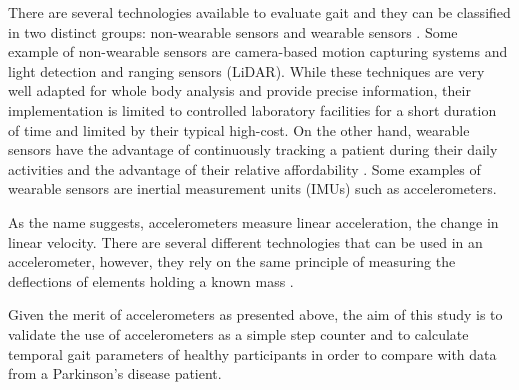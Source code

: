 There are several technologies available to evaluate gait and they can be classified in two distinct groups: non-wearable sensors and wearable sensors   \cite{muro-de-la-herran_gait_2014}. Some example of non-wearable sensors are camera-based motion capturing systems and light detection and ranging sensors (LiDAR). While these techniques are very well adapted for whole body analysis and provide precise information, their implementation is limited to controlled laboratory facilities for a short duration of time and limited by their typical high-cost. On the other hand, wearable sensors have the advantage of continuously tracking a patient during their daily activities and the advantage of their relative affordability \cite{boutaayamou_development_2015}. Some examples of wearable sensors are inertial measurement units (IMUs) such as accelerometers.

As the name suggests, accelerometers measure linear acceleration, the change in linear velocity. There are several different technologies that can be used in an accelerometer, however, they rely on the same principle of measuring the deflections of elements holding a known mass \cite{noauthor_what_2023}.

Given the merit of accelerometers as presented above, the aim of this study is to validate the use of accelerometers as a simple step counter and to calculate temporal gait parameters of healthy participants in order to compare with data from a Parkinson's disease patient.

